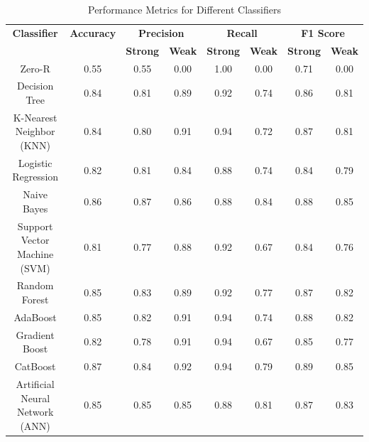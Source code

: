 \documentclass[pt]{article}  %
\begin{document}
\begin{table}[H]
\centering
\begin{tabular}{|c|c|cc|cc|cc|}
\hline
\textbf{Classifier} & \textbf{Accuracy} & \multicolumn{2}{c|}{\textbf{Precision}} & \multicolumn{2}{c|}{\textbf{Recall}} & \multicolumn{2}{c|}{\textbf{F1 Score}} \\ \cline{3-8} 
                    &                   & \textbf{Strong}    & \textbf{Weak}    & \textbf{Strong}    & \textbf{Weak}   & \textbf{Strong}    & \textbf{Weak}    \\ \hline
Zero-R        & 0.55              & 0.55               & 0.00             & 1.00               & 0.00            & 0.71               & 0.00             \\ \hline
Decision Tree        & 0.84              & 0.81               & 0.89             & 0.92               & 0.74            & 0.86               & 0.81             \\ \hline
K-Nearest Neighbor (KNN)       & 0.84              & 0.80               & 0.91             & 0.94               & 0.72            & 0.87               & 0.81             \\ \hline
Logistic Regression        & 0.82              & 0.81               & 0.84             & 0.88               & 0.74            & 0.84               & 0.79             \\ \hline
Naive Bayes        & 0.86              & 0.87               & 0.86             & 0.88               & 0.84            & 0.88               & 0.85             \\ \hline
Support Vector Machine (SVM)        & 0.81              & 0.77               & 0.88             & 0.92               & 0.67            & 0.84               & 0.76             \\ \hline
Random Forest       & 0.85              & 0.83               & 0.89             & 0.92               & 0.77            & 0.87               & 0.82             \\ \hline
AdaBoost        & 0.85              & 0.82               & 0.91             & 0.94               & 0.74            & 0.88               & 0.82             \\ \hline
Gradient Boost        & 0.82              & 0.78               & 0.91             & 0.94               & 0.67            & 0.85               & 0.77             \\ \hline
CatBoost       & 0.87              & 0.84               & 0.92             & 0.94               & 0.79            & 0.89               & 0.85             \\ \hline
Artificial Neural Network (ANN)       & 0.85              & 0.85               & 0.85             & 0.88               & 0.81            & 0.87               & 0.83             \\ \hline
\end{tabular}
\caption{Performance Metrics for Different Classifiers}
\label{tab:classifiers_performance}
\end{table}
\end{document}
